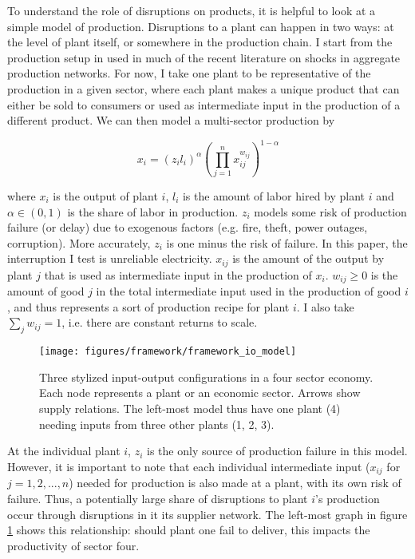\documentclass[11pt]{article}
\begin{document}
To understand the role of disruptions on products, it is helpful to look at a simple model of production. Disruptions to a plant can happen in two ways: at the level of plant itself, or somewhere in the production chain. I start from the production setup in \cite{acemoglu_network_2012} used in much of the recent literature on shocks in aggregate production networks. For now, I take one plant to be representative of the production in a given sector, where each plant makes a unique product that can either be sold to consumers or used as intermediate input in the production of a different product. We can then model a multi-sector production by

\[
x_i =  (z_i l_i)^{\alpha}(\prod^{n}_{j = 1} x_{ij}^{w_{ij}})^{1 - \alpha}
\]

where $x_i$ is the output of plant $i$, \(l_i\) is the amount of labor hired by plant \(i\) and \(\alpha \in (0, 1)\) is the share of labor in production. \(z_i\) models some risk of production failure (or delay) due to exogenous factors (e.g. fire, theft, power outages, corruption). More accurately, \(z_i\) is one minus the risk of failure. In this paper, the interruption I test is unreliable electricity. \(x_{ij}\) is the amount of the output by plant \(j\) that is used as intermediate input in the production of \(x_i\). \(w_{ij} \geq 0\) is the amount of good \(j\) in the total intermediate input used in the production of good \(i\), and thus represents a sort of production recipe for plant \(i\). I also take \(\sum_j w_{ij} = 1\), i.e. there are constant returns to scale.

\begin{figure}[htpb]
	\centering
	\texttt{[image: figures/framework/framework\_io\_model]}
	\caption[Three input-output configurations]{Three stylized input-output configurations in a four sector economy. Each node represents a plant or an economic sector. Arrows show supply relations. The left-most model thus have one plant (4) needing inputs from three other plants (1, 2, 3).}%
	\label{fig:framework-io-model}
\end{figure}

At the individual plant \(i\), \(z_i\) is the only source of production failure in this model. However, it is important to note that each individual intermediate input (\(x_{ij}\) for \(j = 1, 2, ..., n\)) needed for production is also made at a plant, with its own risk of failure. Thus, a potentially large share of disruptions to plant $i$'s production occur through disruptions in it its supplier network. The left-most graph in figure \ref{fig:framework-io-model} shows this relationship: should plant one fail to deliver, this impacts the productivity of sector four.
\end{document}
